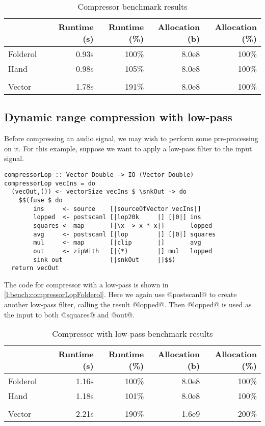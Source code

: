 \begin{table}
\begin{center}
\begin{tabular}{ll|rrrr}
& & Runtime (s)  & Runtime (\%) & Allocation (b) & Allocation (\%) \\
\hline
Folderol &          & 0.93s &   100\% & 8.0e8 & 100\% \\
Hand     &          & 0.98s &   105\% & 8.0e8 & 100\% \\
&&&\\
Vector &            & 1.78s &   191\% & 8.0e8 & 100\%\\
\end{tabular}
\end{center}
\caption[Compressor benchmark results]{Compressor benchmark results}
\label{table:bench:compressor}
\end{table}

\subsection{Dynamic range compression with low-pass}
Before compressing an audio signal, we may wish to perform some pre-processing on it.
For this example, suppose we want to apply a low-pass filter to the input signal.

\begin{lstlisting}[float,label=l:bench:compressorLopFolderol,caption=Folderol implementation of compressor]
compressorLop :: Vector Double -> IO (Vector Double)
compressorLop vecIns = do
  (vecOut,()) <- vectorSize vecIns $ \snkOut -> do
    $$(fuse $ do
        ins     <- source    [|sourceOfVector vecIns|]
        lopped  <- postscanl [|lop20k     |] [|0|] ins
        squares <- map       [|\x -> x * x|]       lopped
        avg     <- postscanl [|lop        |] [|0|] squares
        mul     <- map       [|clip       |]       avg
        out     <- zipWith   [|(*)        |] mul   lopped
        sink out             [|snkOut     |]$$)
  return vecOut
\end{lstlisting}

The code for compressor with a low-pass is shown in \autoref{l:bench:compressorLopFolderol}.
Here we again use @postscanl@ to create another low-pass filter, calling the result @lopped@.
Then @lopped@ is used as the input to both @squares@ and @out@.

\begin{table}
\begin{center}
\begin{tabular}{ll|rrrr}
& & Runtime (s)  & Runtime (\%) & Allocation (b) & Allocation (\%) \\
\hline
Folderol &          & 1.16s &   100\% & 8.0e8 & 100\% \\
Hand     &          & 1.18s &   101\% & 8.0e8 & 100\% \\
&&&\\
Vector &            & 2.21s &   190\% & 1.6e9 & 200\%\\
\end{tabular}
\end{center}
\caption[Compressor with low-pass benchmark results]{Compressor with low-pass benchmark results}
\label{table:bench:compressorlop}
\end{table}


